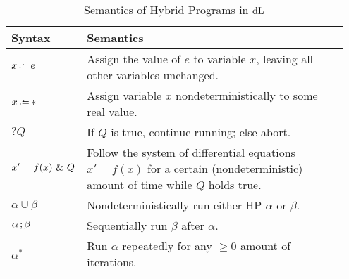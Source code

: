 \begin{table}%
  \caption{Semantics of Hybrid Programs in $\mathop{}\!\mathrm{d} \text{L}$}\label{tab:hps}
  \vspace{-0.2cm}
  \centering
  \renewcommand{\arraystretch}{1.2}
  \begin{tabular}{p{0.18\linewidth}p{0.77\linewidth}}
  \toprule
  Syntax  &  Semantics\\
  \midrule
  $x \dlassign e$ & Assign the value of $e$ to variable $x$, leaving all other variables unchanged.\\
  $x \dlassign *$ & Assign variable $x$ nondeterministically to some real value. \\
  $?Q$ & If $Q$ is {true}, continue running; else abort. \\
  $x'=f(x) \operatorname{\,\&\,} Q$ & Follow the system of differential equations $x'=f(x)$ for a certain (nondeterministic) amount of time while $Q$ holds true.\\
  $\alpha \cup \beta$ & Nondeterministically run either HP $\alpha$ or $\beta$.\\
  $\alpha \operatorname*{;} \beta$ & Sequentially run $\beta$ after $\alpha$.\\
  $\alpha^*$ & Run $\alpha$ repeatedly for any $\geq0$ amount of iterations.\\
  \bottomrule
  \end{tabular}
\end{table}
